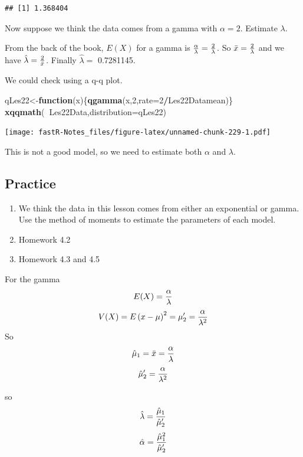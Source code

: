 \documentclass[]{book}
\newenvironment{Shaded}{\begin{snugshade}}{\end{snugshade}}
\newcommand{\KeywordTok}[1]{\textcolor[rgb]{0.13,0.29,0.53}{\textbf{#1}}}
\newcommand{\DataTypeTok}[1]{\textcolor[rgb]{0.13,0.29,0.53}{#1}}
\newcommand{\DecValTok}[1]{\textcolor[rgb]{0.00,0.00,0.81}{#1}}
\newcommand{\ControlFlowTok}[1]{\textcolor[rgb]{0.13,0.29,0.53}{\textbf{#1}}}
\newcommand{\OperatorTok}[1]{\textcolor[rgb]{0.81,0.36,0.00}{\textbf{#1}}}
\newcommand{\NormalTok}[1]{#1}
\providecommand{\tightlist}{%
  \setlength{\itemsep}{0pt}\setlength{\parskip}{0pt}}
\theoremstyle{definition}
\theoremstyle{definition}
\theoremstyle{definition}
\theoremstyle{remark}
\begin{document}
\begin{verbatim}
## [1] 1.368404
\end{verbatim}

Now suppose we think the data comes from a gamma with \(\alpha = 2\).
Estimate \(\lambda\).

From the back of the book, \(E(X)\) for a gamma is
\({\alpha \over \lambda} = {2 \over \lambda}\). So
\(\bar{x}= {2 \over \lambda}\) and we have
\(\hat{\lambda}={2 \over \bar{x}}\). Finally \(\hat{\lambda}=\)
0.7281145.

We could check using a q-q plot.

\begin{Shaded}
\begin{Highlighting}[]
\NormalTok{qLes22<-}\ControlFlowTok{function}\NormalTok{(x)\{}\KeywordTok{qgamma}\NormalTok{(x,}\DecValTok{2}\NormalTok{,}\DataTypeTok{rate=}\DecValTok{2}\OperatorTok{/}\NormalTok{Les22Datamean)\}}
\KeywordTok{xqqmath}\NormalTok{(}\OperatorTok{~}\NormalTok{Les22Data,}\DataTypeTok{distribution=}\NormalTok{qLes22)}
\end{Highlighting}
\end{Shaded}

\texttt{[image: fastR-Notes\_files/figure-latex/unnamed-chunk-229-1.pdf]}

This is not a good model, so we need to estimate both \(\alpha\) and
\(\lambda\).

\subsection{Practice}\label{practice-6}

\begin{enumerate}
\def\labelenumi{\arabic{enumi}.}
\tightlist
\item
  We think the data in this lesson comes from either an exponential or
  gamma. Use the method of moments to estimate the parameters of each
  model.
\item
  Homework 4.2
\item
  Homework 4.3 and 4.5
\end{enumerate}

For the gamma \[E(X)={\alpha \over \lambda}\]
\[V(X)=E\left( x-\mu  \right)^2=\mu_{2}'={\alpha \over \lambda^2}\] So
\[\hat{\mu}_{1}=\bar{x}={\alpha \over \lambda}\]
\[\hat{\mu}_{2}'={\alpha \over \lambda^2}\]

so \[\hat{\lambda}={\hat{\mu}_{1} \over \hat{\mu}_{2}'}\]
\[\hat{\alpha}={\hat{\mu}_{1}^{2} \over \hat{\mu}_{2}'}\]
\end{document}
